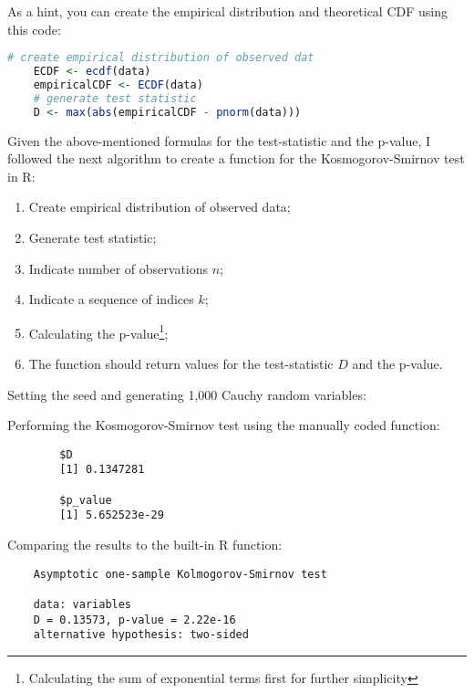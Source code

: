 \documentclass[12pt,letterpaper]{article}
\begin{document}
	
\noindent As a hint, you can create the empirical distribution and theoretical CDF using this code:

\begin{lstlisting}[language=R]
	# create empirical distribution of observed dat
	ECDF <- ecdf(data)
	empiricalCDF <- ECDF(data)
	# generate test statistic
	D <- max(abs(empiricalCDF - pnorm(data))) \end{lstlisting}
	
	Given the above-mentioned formulas for the test-statistic and the p-value, I followed the next algorithm to create a function for the Kosmogorov-Smirnov test in R:
	
\begin{enumerate}[noitemsep]
	\item Create empirical distribution of observed data;
	\item Generate test statistic;
	\item Indicate number of observations $\textit{n}$;
	\item Indicate a sequence of indices $\textit{k}$;
	\item Calculating the p-value\footnote{Calculating the sum of exponential terms first for further simplicity};
	\item The function should return values for the test-statistic $D$ and the p-value.
\end{enumerate}
	
	 
	
Setting the seed and generating 1,000 Cauchy random variables:
	
		 
		
Performing the Kosmogorov-Smirnov test using the manually coded function:
		 
		
	\begin{verbatim}
		$D
		[1] 0.1347281
		
		$p_value
		[1] 5.652523e-29
	\end{verbatim}
	
	Comparing the results to the built-in R function: 
	
		 
		
\begin{verbatim}
	Asymptotic one-sample Kolmogorov-Smirnov test
	
	data: variables
	D = 0.13573, p-value = 2.22e-16
	alternative hypothesis: two-sided
\end{verbatim}
\end{document}
